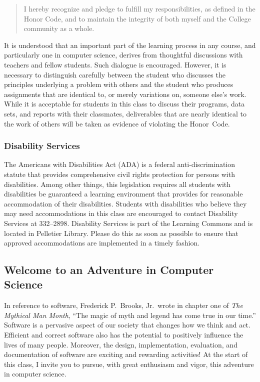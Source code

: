 \documentclass[11pt]{article}
\begin{document}
\vspace*{-.11in}
\begin{quote}
  I hereby recognize and pledge to fulfill my responsibilities, as defined in the Honor Code, and to maintain the
  integrity of both myself and the College community as a whole.
\end{quote}
\vspace*{-.11in}

\noindent It is understood that an important part of the learning process in any course, and particularly one in
computer science, derives from thoughtful discussions with teachers and fellow students. Such dialogue is encouraged.
However, it is necessary to distinguish carefully between the student who discusses the principles underlying a problem
with others and the student who produces assignments that are identical to, or merely variations on, someone else's
work. While it is acceptable for students in this class to discuss their programs, data sets, and reports with their
classmates, deliverables that are nearly identical to the work of others will be taken as evidence of violating the
\mbox{Honor Code}.

\subsubsection*{Disability Services}

The Americans with Disabilities Act (ADA) is a federal anti-discrimination statute that provides comprehensive civil
rights protection for persons with disabilities. Among other things, this legislation requires all students with
disabilities be guaranteed a learning environment that provides for reasonable accommodation of their disabilities.
Students with disabilities who believe they may need accommodations in this class are encouraged to contact Disability
Services at 332--2898. Disability Services is part of the Learning Commons and is located in Pelletier Library.
Please do this as soon as possible to ensure that approved accommodations are implemented in a timely fashion.

\subsection*{Welcome to an Adventure in Computer Science}

In reference to software, Frederick P.\ Brooks, Jr.\ wrote in chapter one of {\em The Mythical Man Month}, ``The magic
of myth and legend has come true in our time.'' Software is a pervasive aspect of our society that changes how we think
and act. Efficient and correct software also has the potential to positively influence the lives of many people.
Moreover, the design, implementation, evaluation, and documentation of software are exciting and rewarding activities!
At the start of this class, I invite you to pursue, with great enthusiasm and vigor, this adventure in computer science.
\end{document}
